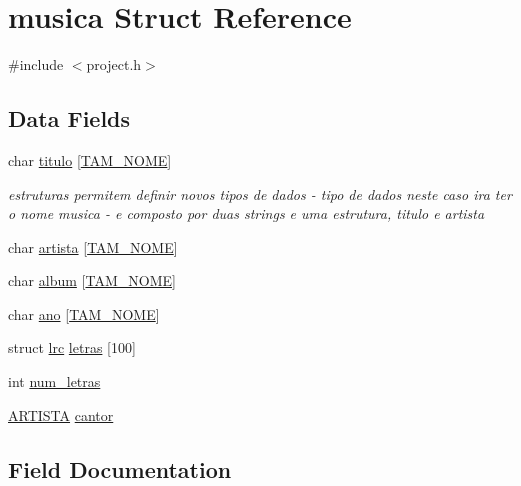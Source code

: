 \hypertarget{structmusica}{}\section{musica Struct Reference}
\label{structmusica}


{\ttfamily \#include $<$project.\+h$>$}

\subsection*{Data Fields}
\begin{DoxyCompactItemize}
\item 
char \mbox{\hyperlink{structmusica_a6dba2e20e00fd8307192a7e0dce4b3d9}{titulo}} \mbox{[}\mbox{\hyperlink{project_8h_ad0e480e07eae04b077948c75deb75422}{T\+A\+M\+\_\+\+N\+O\+ME}}\mbox{]}
\begin{DoxyCompactList}\small\item\em estruturas permitem definir novos tipos de dados -\/ tipo de dados neste caso ira ter o nome musica -\/ e composto por duas strings e uma estrutura, titulo e artista \end{DoxyCompactList}\item 
char \mbox{\hyperlink{structmusica_a3ece80975d3e1263d85091ba633e7690}{artista}} \mbox{[}\mbox{\hyperlink{project_8h_ad0e480e07eae04b077948c75deb75422}{T\+A\+M\+\_\+\+N\+O\+ME}}\mbox{]}
\item 
char \mbox{\hyperlink{structmusica_a5e90504f1995d65d2fe8574737998255}{album}} \mbox{[}\mbox{\hyperlink{project_8h_ad0e480e07eae04b077948c75deb75422}{T\+A\+M\+\_\+\+N\+O\+ME}}\mbox{]}
\item 
char \mbox{\hyperlink{structmusica_a425a18cdc020d8ccc82c46c220d521f9}{ano}} \mbox{[}\mbox{\hyperlink{project_8h_ad0e480e07eae04b077948c75deb75422}{T\+A\+M\+\_\+\+N\+O\+ME}}\mbox{]}
\item 
struct \mbox{\hyperlink{structlrc}{lrc}} \mbox{\hyperlink{structmusica_a5243e7f8641c5be23da1e7391c8fc4d6}{letras}} \mbox{[}100\mbox{]}
\item 
int \mbox{\hyperlink{structmusica_a65092ca80b96aad412ee3f06c9b506e3}{num\+\_\+letras}}
\item 
\mbox{\hyperlink{project_8h_a8f88f8ad560381cf6e92b1ff3ca5efb2}{A\+R\+T\+I\+S\+TA}} \mbox{\hyperlink{structmusica_a8b6fc763fbedbcbdf1ed51a276b15e9b}{cantor}}
\end{DoxyCompactItemize}


\subsection{Field Documentation}
\mbox{\label{structmusica_a5e90504f1995d65d2fe8574737998255}} 
